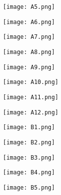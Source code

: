 \documentclass{article}
\begin{document}
\begin{figure}[!hb]
\centering
\texttt{[image:  A5.png]}
\end{figure}

\begin{figure}[!hb]
\centering
\texttt{[image:  A6.png]}
\end{figure}

\begin{figure}[!hb]
\centering
\texttt{[image:  A7.png]}
\end{figure}

\begin{figure}[!hb]
\centering
\texttt{[image:  A8.png]}
\end{figure}

\begin{figure}[!hb]
\centering
\texttt{[image:  A9.png]}
\end{figure}

\begin{figure}[!hb]
\centering
\texttt{[image:  A10.png]}
\end{figure}

\begin{figure}[!hb]
\centering
\texttt{[image:  A11.png]}
\end{figure}

\begin{figure}[!hb]
\centering
\texttt{[image:  A12.png]}
\end{figure}

\begin{figure}[!hb]
\centering
\texttt{[image:  B1.png]}
\end{figure}

\begin{figure}[!hb]
\centering
\texttt{[image:  B2.png]}
\end{figure}

\begin{figure}[!hb]
\centering
\texttt{[image:  B3.png]}
\end{figure}

\begin{figure}[!hb]
\centering
\texttt{[image:  B4.png]}
\end{figure}

\begin{figure}[!hb]
\centering
\texttt{[image:  B5.png]}
\end{figure}
\end{document}
